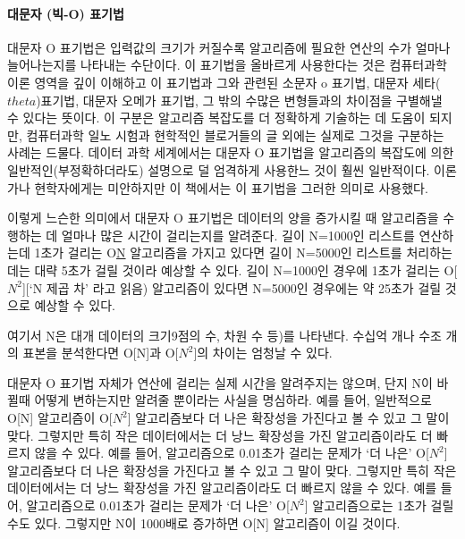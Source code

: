 \documentclass[11pt]{article}
\begin{document}
    \hypertarget{uxb300uxbb38uxc790-uxbe45-o-uxd45cuxae30uxbc95}{%
\paragraph{대문자 (빅-O)
표기법}\label{uxb300uxbb38uxc790-uxbe45-o-uxd45cuxae30uxbc95}}

대문자 O 표기법은 입력값의 크기가 커질수록 알고리즘에 필요한 연산의 수가
얼마나 늘어나는지를 나타내는 수단이다. 이 표기법을 올바르게 사용한다는
것은 컴퓨터과학 이론 영역을 깊이 이해하고 이 표기법과 그와 관련된 소문자
o 표기법, 대문자 세타(\(theta\))표기법, 대문자 오메가 표기법, 그 밖의
수많은 변형들과의 차이점을 구별해낼 수 있다는 뜻이다. 이 구분은 알고리즘
복잡도를 더 정확하게 기술하는 데 도움이 되지만, 컴퓨터과학 일노 시험과
현학적인 블로거들의 글 외에는 실제로 그것을 구분하는 사례는 드물다.
데이터 과학 세계에서는 대문자 O 표기법을 알고리즘의 복잡도에 의한
일반적인(부정확하더라도) 설명으로 덜 엄격하게 사용한느 것이 훨씬
일반적이다. 이론가나 현학자에게는 미안하지만 이 책에서는 이 표기법을
그러한 의미로 사용했다.

이렇게 느슨한 의미에서 대문자 O 표기법은 데이터의 양을 증가시킬 때
알고리즘을 수행하는 데 얼마나 많은 시간이 걸리는지를 알려준다. 길이
N=1000인 리스트를 연산하는데 1초가 걸리는 O\href{'N차'라고\%20읽음}{N}
알고리즘을 가지고 있다면 길이 N=5000인 리스트를 처리하는 데는 대략 5초가
걸릴 것이라 예상할 수 있다. 길이 N=1000인 경우에 1초가 걸리는
O{[}\(N^2\){]}{[}`N 제곱 차' 라고 읽음) 알고리즘이 있다면 N=5000인
경우에는 약 25초가 걸릴 것으로 예상할 수 있다.

여기서 N은 대개 데이터의 크기9점의 수, 차원 수 등)를 나타낸다. 수십억
개나 수조 개의 표본을 분석한다면 O{[}N{]}과 O{[}\(N^2\){]}의 차이는
엄청날 수 있다.

대문자 O 표기법 자체가 연산에 걸리는 실제 시간을 알려주지는 않으며, 단지
N이 바뀔때 어떻게 변하는지만 알려줄 뿐이라는 사실을 명심하라. 예를 들어,
일반적으로 O{[}N{]} 알고리즘이 O{[}\(N^2\){]} 알고리즘보다 더 나은
확장성을 가진다고 볼 수 있고 그 말이 맞다. 그렇지만 특히 작은
데이터에서는 더 낭느 확장성을 가진 알고리즘이라도 더 빠르지 않을 수
있다. 예를 들어, 알고리즘으로 0.01초가 걸리는 문제가 `더 나은'
O{[}\(N^2\){]} 알고리즘보다 더 나은 확장성을 가진다고 볼 수 있고 그 말이
맞다. 그렇지만 특히 작은 데이터에서는 더 낭느 확장성을 가진
알고리즘이라도 더 빠르지 않을 수 있다. 예를 들어, 알고리즘으로 0.01초가
걸리는 문제가 `더 나은' O{[}\(N^2\){]} 알고리즘으로는 1초가 걸릴 수도
있다. 그렇지만 N이 1000배로 증가하면 O{[}N{]} 알고리즘이 이길 것이다.
\end{document}
